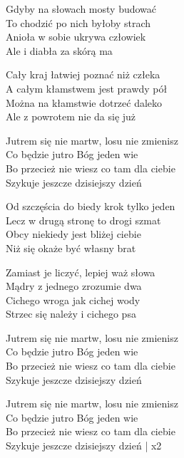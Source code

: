 \begin{text}
Gdyby na słowach mosty budować\\
To chodzić po nich byłoby strach\\
Anioła w sobie ukrywa człowiek\\
Ale i diabła za skórą ma

Cały kraj łatwiej poznać niż człeka\\
A całym kłamstwem jest prawdy pół\\
Można na kłamstwie dotrzeć daleko\\
Ale z powrotem nie da się już

Jutrem się nie martw, losu nie zmienisz\\
Co będzie jutro Bóg jeden wie\\
Bo przecież nie wiesz co tam dla ciebie\\
Szykuje jeszcze dzisiejszy dzień

Od szczęścia do biedy krok tylko jeden\\
Lecz w drugą stronę to drogi szmat\\
Obcy niekiedy jest bliżej ciebie\\
Niż się okaże być własny brat

Zamiast je liczyć, lepiej waż słowa\\
Mądry z jednego zrozumie dwa\\
Cichego wroga jak cichej wody\\
Strzec się należy i cichego psa

Jutrem się nie martw, losu nie zmienisz\\
Co będzie jutro Bóg jeden wie\\
Bo przecież nie wiesz co tam dla ciebie\\
Szykuje jeszcze dzisiejszy dzień

Jutrem się nie martw, losu nie zmienisz\\
Co będzie jutro Bóg jeden wie\\
Bo przecież nie wiesz co tam dla ciebie\\
Szykuje jeszcze dzisiejszy dzień | x2
\end{text}
